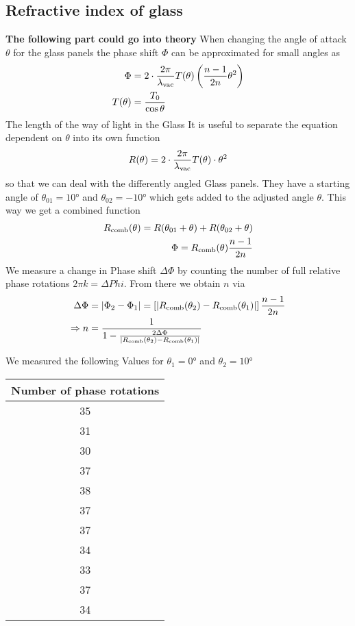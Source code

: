 \subsection{Refractive index of glass}
\textbf{The following part could go into theory}
When changing the angle of attack $\theta$ for the glass panels the phase shift $\Phi$ can be approximated for small angles
as
\begin{align}
	\Phi      & = 2 \cdot \frac{2\pi}{\lambda_\text{vac}} T(\theta)\left(\frac{n-1}{2n} \theta^2 \right) \\
	T(\theta) & = \frac{T_0}{\cos\theta}
\end{align}
The length of the way of light in the Glass
It is useful to separate the equation dependent on $\theta$ into its own function
\begin{align}
	R(\theta)= 2\cdot \frac{2\pi}{\lambda_\text{vac}} T(\theta)\cdot \theta^2
\end{align}
so that we can deal with the differently angled Glass panels.
They have a starting angle of $\theta_{01} = 10°$ and $\theta_{02}= -10°$
which gets added to the adjusted angle $\theta$.
This way we get a combined function
\begin{align}
	R_\text{comb} (\theta) = R(\theta_{01}+\theta) + R(\theta_{02}+\theta) \\
	\Phi = R_\text{comb}(\theta) \frac{n-1}{2n}
\end{align}
We measure a change in Phase shift $\Delta \Phi$ by counting the number
of full relative phase rotations $2 \pi k = \Delta Phi$.
From there we obtain $n$ via
\begin{align}
	\Delta \Phi   & = \left|\Phi_2 -\Phi_1\right|                                                                  %
	= \left[ \left|R_\t{comb}(\theta_{2})-R_\t{comb}(\theta_{1})\right| \right] \frac{n-1}{2n}                     \\
	\Rightarrow n & = \frac{1}{1-\frac{2\Delta \Phi}{\left|R_\t{comb}(\theta_{2})-R_\t{comb}(\theta_{1})\right|} }
\end{align}

We measured the following Values for $\theta_1 = 0°$ and $\theta_2 = 10°$
\begin{table}[H]
	\centering
	\begin{tabular}{c}
		\toprule
		Number of phase rotations \\
		\midrule
		35                        \\
		31                        \\
		30                        \\
		37                        \\
		38                        \\
		37                        \\
		37                        \\
		34                        \\
		33                        \\
		37                        \\
		34                        \\
		\bottomrule
	\end{tabular}
\end{table}

